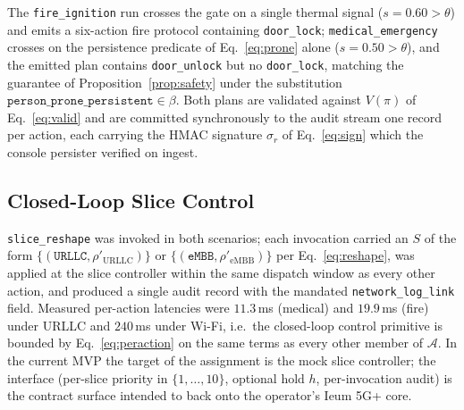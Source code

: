 \begin{table}[!htbp]
\centering
\caption{Scenario outcomes on the live stack. $|\hat\pi|$ counts emitted
actions after $M(\cdot)$; all runs produced $V(\hat\pi)=1$ and every audit
verified against its HMAC signature.}
\label{tab:scenarios}
\end{table}

The \texttt{fire\_ignition} run crosses the gate on a single thermal signal
($s=0.60>\theta$) and emits a six-action fire protocol containing
\texttt{door\_lock}; \texttt{medical\_emergency} crosses on the persistence
predicate of Eq.~\eqref{eq:prone} alone ($s=0.50>\theta$), and the emitted
plan contains \texttt{door\_unlock} but no \texttt{door\_lock}, matching the
guarantee of Proposition~\ref{prop:safety} under the substitution
$\texttt{person\_prone\_persistent}\in\beta$. Both plans are validated against
$V(\pi)$ of Eq.~\eqref{eq:valid} and are committed synchronously to the audit
stream one record per action, each carrying the HMAC signature
$\sigma_r$ of Eq.~\eqref{eq:sign} which the console persister verified on
ingest.

\subsection{\textbf{Closed-Loop Slice Control}}
\label{sec:res-loop}
\texttt{slice\_reshape} was invoked in both scenarios; each invocation
carried an $S$ of the form $\{(\texttt{URLLC},\rho'_{\text{URLLC}})\}$ or
$\{(\texttt{eMBB},\rho'_{\text{eMBB}})\}$ per Eq.~\eqref{eq:reshape}, was
applied at the slice controller within the same dispatch window as every
other action, and produced a single audit record with the mandated
\texttt{network\_log\_link} field. Measured per-action latencies were
$11.3$\,ms (medical) and $19.9$\,ms (fire) under URLLC and $240$\,ms under
Wi-Fi, i.e.\ the closed-loop control primitive is bounded by
Eq.~\eqref{eq:peraction} on the same terms as every other member of
$\mathcal{A}$. In the current MVP the target of the assignment is the mock
slice controller; the interface (per-slice priority in $\{1,\dots,10\}$,
optional hold $h$, per-invocation audit) is the contract surface intended to
back onto the operator's Ieum 5G+ core.

